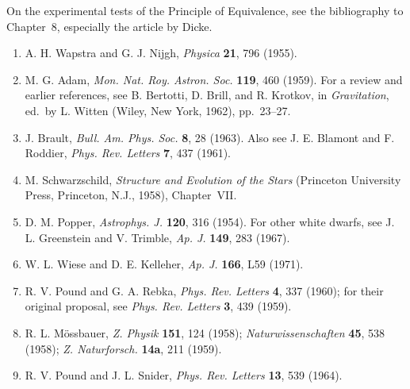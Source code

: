 On the experimental tests of the Principle of Equivalence, see the
bibliography to Chapter~8, especially the article by Dicke.


\begin{enumerate}
  \item {}\label{ch3-ref-1}
  A. H. Wapstra and G. J. Nijgh, \emph{Physica} \textbf{21}, 796 (1955).

  \item {}\label{ch3-ref-2}
  M. G. Adam, \emph{Mon. Nat. Roy. Astron. Soc.} \textbf{119}, 460
  (1959). For a review and earlier references, see B. Bertotti, D. Brill,
  and R. Krotkov, in \emph{Gravitation}, ed.\ by L. Witten
  (Wiley, New York, 1962), pp.~23--27.

  \item {}\label{ch3-ref-3}
  J. Brault, \emph{Bull. Am. Phys. Soc.} \textbf{8}, 28 (1963).
  Also see J. E. Blamont and F. Roddier,
  \emph{Phys. Rev. Letters} \textbf{7}, 437 (1961).

  \item {}\label{ch3-ref-4}
  M. Schwarzschild, \emph{Structure and Evolution of the Stars}
  (Princeton University Press, Princeton, N.J., 1958), Chapter~VII.

  \item {}\label{ch3-ref-5}
  D. M. Popper, \emph{Astrophys. J.} \textbf{120}, 316 (1954).
  For other white dwarfs, see J. L. Greenstein and V. Trimble,
  \emph{Ap. J.} \textbf{149}, 283 (1967).

  \item[5a.] \label{ch3-ref-5a}
  W. L. Wiese and D. E. Kelleher,
  \emph{Ap. J.} \textbf{166}, L59 (1971).

  \item[6.] \label{ch3-ref-6}
  R. V. Pound and G. A. Rebka,
  \emph{Phys. Rev. Letters} \textbf{4}, 337 (1960); for their original
  proposal, see \emph{Phys. Rev. Letters} \textbf{3}, 439 (1959).

  \item[7.] \label{ch3-ref-7}
  R. L. M\"ossbauer, \emph{Z. Physik} \textbf{151}, 124 (1958);
  \emph{Naturwissenschaften} \textbf{45}, 538 (1958);
  \emph{Z. Naturforsch.} \textbf{14a}, 211 (1959).

  \item[8.] \label{ch3-ref-8}
  R. V. Pound and J. L. Snider,
  \emph{Phys. Rev. Letters} \textbf{13}, 539 (1964).


\end{enumerate}

